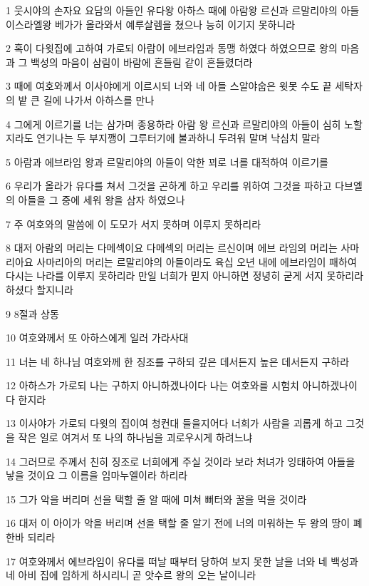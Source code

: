 \par 1 웃시야의 손자요 요담의 아들인 유다왕 아하스 때에 아람왕 르신과 르말리야의 아들 이스라엘왕 베가가 올라와서 예루살렘을 쳤으나 능히 이기지 못하니라
\par 2 혹이 다윗집에 고하여 가로되 아람이 에브라임과 동맹 하였다 하였으므로 왕의 마음과 그 백성의 마음이 삼림이 바람에 흔들림 같이 흔들렸더라
\par 3 때에 여호와께서 이사야에게 이르시되 너와 네 아들 스알야숩은 윗못 수도 끝 세탁자의 밭 큰 길에 나가서 아하스를 만나
\par 4 그에게 이르기를 너는 삼가며 종용하라 아람 왕 르신과 르말리야의 아들이 심히 노할지라도 연기나는 두 부지깽이 그루터기에 불과하니 두려워 말며 낙심치 말라
\par 5 아람과 에브라임 왕과 르말리야의 아들이 악한 꾀로 너를 대적하여 이르기를
\par 6 우리가 올라가 유다를 쳐서 그것을 곤하게 하고 우리를 위하여 그것을 파하고 다브엘의 아들을 그 중에 세워 왕을 삼자 하였으나
\par 7 주 여호와의 말씀에 이 도모가 서지 못하며 이루지 못하리라
\par 8 대저 아람의 머리는 다메섹이요 다메섹의 머리는 르신이며 에브 라임의 머리는 사마리아요 사마리아의 머리는 르말리야의 아들이라도 육십 오년 내에 에브라임이 패하여 다시는 나라를 이루지 못하리라 만일 너희가 믿지 아니하면 정녕히 굳게 서지 못하리라 하셨다 할지니라
\par 9 8절과 상동
\par 10 여호와께서 또 아하스에게 일러 가라사대
\par 11 너는 네 하나님 여호와께 한 징조를 구하되 깊은 데서든지 높은 데서든지 구하라
\par 12 아하스가 가로되 나는 구하지 아니하겠나이다 나는 여호와를 시험치 아니하겠나이다 한지라
\par 13 이사야가 가로되 다윗의 집이여 청컨대 들을지어다 너희가 사람을 괴롭게 하고 그것을 작은 일로 여겨서 또 나의 하나님을 괴로우시게 하려느냐
\par 14 그러므로 주께서 친히 징조로 너희에게 주실 것이라 보라 처녀가 잉태하여 아들을 낳을 것이요 그 이름을 임마누엘이라 하리라
\par 15 그가 악을 버리며 선을 택할 줄 알 때에 미쳐 뻐터와 꿀을 먹을 것이라
\par 16 대저 이 아이가 악을 버리며 선을 택할 줄 알기 전에 너의 미워하는 두 왕의 땅이 폐한바 되리라
\par 17 여호와께서 에브라임이 유다를 떠날 때부터 당하여 보지 못한 날을 너와 네 백성과 네 아비 집에 임하게 하시리니 곧 앗수르 왕의 오는 날이니라
